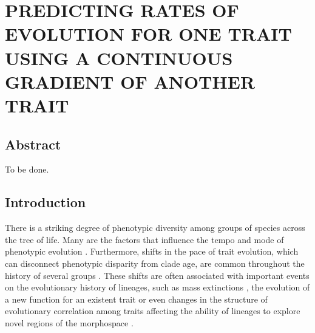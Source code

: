
\chapter{PREDICTING RATES OF EVOLUTION FOR ONE TRAIT USING A CONTINUOUS GRADIENT OF ANOTHER TRAIT}

\section{Abstract}

To be done.

\section{Introduction}

There is a striking degree of phenotypic diversity among groups of species across the tree of life. Many are the factors that influence the tempo and mode of phenotypic evolution \citep[e.g.,][]{adams_are_2009, cooper_what_2009, hipsley_morphological_2014}. Furthermore, shifts in the pace of trait evolution, which can disconnect phenotypic disparity from clade age, are common throughout the history of several groups \citep{Eastman_2011, benson_rates_2013, mahler_exceptional_2013, Rabosky_2013, slater_phylogenetic_2013, rabosky_analysis_2014, Uyeda_BayOU}. These shifts are often associated with important events on the evolutionary history of lineages, such as mass extinctions \citep{slater_phylogenetic_2013}, the evolution of a new function for an existent trait \citep{benson_rates_2013, dececchi_body_2013} or even changes in the structure of evolutionary correlation among traits affecting the ability of lineages to explore novel regions of the morphospace \citep{revell_phylogenetic_2009, caetano_sysbio_2017}.

